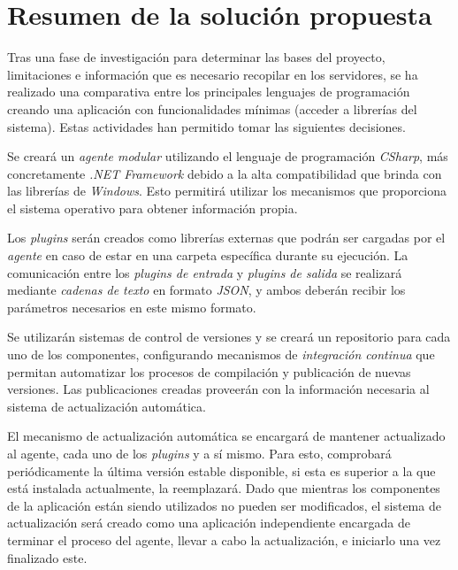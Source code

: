 \section{Resumen de la solución propuesta} \label{sec:sol}

    Tras una fase de investigación para determinar las bases del proyecto, limitaciones e información que es necesario recopilar en los servidores, se ha realizado una comparativa entre los principales lenguajes de programación creando una aplicación con funcionalidades mínimas (acceder a librerías del sistema). Estas actividades han permitido tomar las siguientes decisiones.
    
    Se creará un \textit{agente modular} utilizando el lenguaje de programación \textit{CSharp}, más concretamente \textit{.NET Framework} debido a la alta compatibilidad que brinda con las librerías de \textit{Windows}. Esto permitirá utilizar los mecanismos que proporciona el sistema operativo para obtener información propia.
    
    Los \textit{plugins} serán creados como librerías externas que podrán ser cargadas por el \textit{agente} en caso de estar en una carpeta específica durante su ejecución. La comunicación entre los \textit{plugins de entrada} y \textit{plugins de salida} se realizará mediante \textit{cadenas de texto} en formato \textit{JSON}, y ambos deberán recibir los parámetros necesarios en este mismo formato.
    
    Se utilizarán sistemas de control de versiones y se creará un repositorio para cada uno de los componentes, configurando mecanismos de \textit{integración continua} que permitan automatizar los procesos de compilación y publicación de nuevas versiones. Las publicaciones creadas proveerán con la información necesaria al sistema de actualización automática.
    
    El mecanismo de actualización automática se encargará de mantener actualizado al agente, cada uno de los \textit{plugins} y a sí mismo. Para esto, comprobará periódicamente la última versión estable disponible, si esta es superior a la que está instalada actualmente, la reemplazará. Dado que mientras los componentes de la aplicación están siendo utilizados no pueden ser modificados, el sistema de actualización será creado como una aplicación independiente encargada de terminar el proceso del agente, llevar a cabo la actualización, e iniciarlo una vez finalizado este.
    
